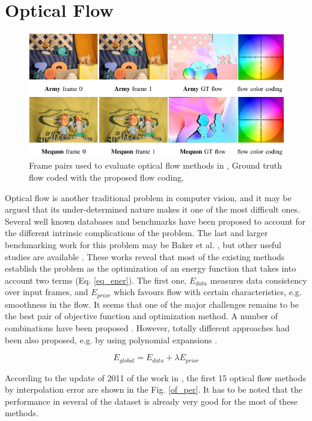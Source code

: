 \section{Optical Flow}

   \begin{figure}[thpb]
      \centering
      \includegraphics[width=1.0\textwidth]{../images/of_db.png}
      \caption{Frame pairs used to evaluate optical flow methods in \cite{c17}, Ground truth flow coded with the proposed flow coding. }
      \label{tr_db}
   \end{figure}

Optical flow is another traditional problem in computer vision, and it may be argued that its under-determined nature makes it one of the most difficult ones. 
Several well known databases and benchmarks have been proposed to account for the different intrinsic complications of the problem. The last and larger benchmarking 
work for this problem may be Baker et al. \cite{c17}, but other useful studies are available \cite{c27}. 
These works reveal that most of the existing methods establish the problem as the optimization of an energy function that takes into account two terms (Eq. \ref{eq_ener}). The first one, $E_{data}$ 
measures data consistency over input frames, and $E_{prior}$ which favours flow with certain characteristics, e.g. smoothness in the flow. It seems that one of the major 
challenges remains to be the best pair of objective function and optimization method. A number of combinations have been proposed \cite{c29}\cite{c30}\cite{c32}. However, 
totally different approaches had been also proposed, e.g. by using polynomial expansions \cite{c28}.

\begin{equation}
E_{global} = E_{data} + \lambda E_{prior}
\label{eq_ener}
\end{equation}

According to the update of 2011 of the work in \cite{c17}, the first 15 optical flow methods by interpolation error are shown in the Fig. \ref{of_per}. It has to be noted that the performance in several of the dataset is already very good for the most of these methods.

